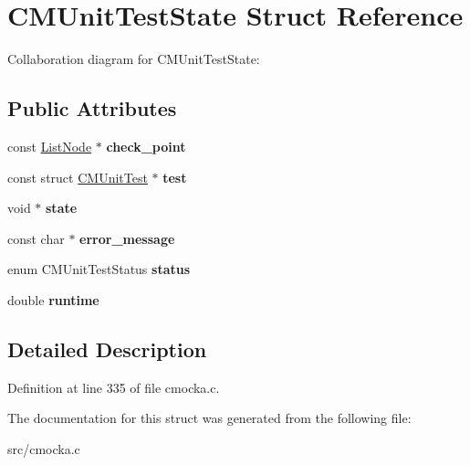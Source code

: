 \hypertarget{structCMUnitTestState}{}\section{C\+M\+Unit\+Test\+State Struct Reference}
\label{structCMUnitTestState}


Collaboration diagram for C\+M\+Unit\+Test\+State\+:
\subsection*{Public Attributes}
\begin{DoxyCompactItemize}
\item 
\mbox{\label{structCMUnitTestState_ad769ff44848de44f80c93d61a7eddb17}} 
const \hyperlink{structListNode}{List\+Node} $\ast$ {\bfseries check\+\_\+point}
\item 
\mbox{\label{structCMUnitTestState_abf83fd798716db84ada52946bf11cf4c}} 
const struct \hyperlink{structCMUnitTest}{C\+M\+Unit\+Test} $\ast$ {\bfseries test}
\item 
\mbox{\label{structCMUnitTestState_ad923f78d81da599c113295cd33a9e959}} 
void $\ast$ {\bfseries state}
\item 
\mbox{\label{structCMUnitTestState_a9649fbe018ad0be988e4e17fb42f9d7f}} 
const char $\ast$ {\bfseries error\+\_\+message}
\item 
\mbox{\label{structCMUnitTestState_a669ce36dac14c0cc9380e336382fe415}} 
enum C\+M\+Unit\+Test\+Status {\bfseries status}
\item 
\mbox{\label{structCMUnitTestState_a9e6b7af92cff16f613c0d89022bb20de}} 
double {\bfseries runtime}
\end{DoxyCompactItemize}


\subsection{Detailed Description}


Definition at line 335 of file cmocka.\+c.



The documentation for this struct was generated from the following file\+:\begin{DoxyCompactItemize}
\item 
src/cmocka.\+c\end{DoxyCompactItemize}
